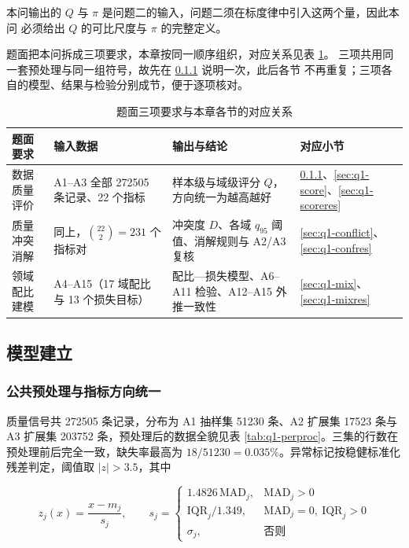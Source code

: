\documentclass[bwprint]{gmcmthesis}
\numberwithin{equation}{section}
\numberwithin{figure}{section}
\numberwithin{table}{section}
\begin{document}
本问输出的 $Q$ 与 $\pi$ 是问题二的输入，问题二须在标度律中引入这两个量，因此本问
必须给出 $Q$ 的可比尺度与 $\pi$ 的完整定义。

题面把本问拆成三项要求，本章按同一顺序组织，对应关系见表 \ref{tab:q1-map}。
三项共用同一套预处理与同一组符号，故先在 \ref{sec:q1-pre} 说明一次，此后各节
不再重复；三项各自的模型、结果与检验分别成节，便于逐项核对。

\begin{table}[htp!]
\centering
\renewcommand\arraystretch{1.25}
\caption{题面三项要求与本章各节的对应关系}\label{tab:q1-map}
\begin{tabularx}{\textwidth}{@{}lXXX@{}}
\toprule
题面要求 & 输入数据 & 输出与结论 & 对应小节 \\
\midrule
数据质量评价 & A1--A3 全部 272505 条记录、22 个指标 &
样本级与域级评分 $Q$，方向统一为越高越好 & \ref{sec:q1-pre}、\ref{sec:q1-score}、\ref{sec:q1-scoreres} \\
质量冲突消解 & 同上，$\binom{22}{2}=231$ 个指标对 &
冲突度 $D$、各域 $q_{95}$ 阈值、消解规则与 A2/A3 复核 & \ref{sec:q1-conflict}、\ref{sec:q1-confres} \\
领域配比建模 & A4--A15（17 域配比与 13 个损失目标） &
配比—损失模型、A6--A11 检验、A12--A15 外推一致性 & \ref{sec:q1-mix}、\ref{sec:q1-mixres} \\
\bottomrule
\end{tabularx}
\end{table}

\subsection{模型建立}

\subsubsection{公共预处理与指标方向统一}\label{sec:q1-pre}

质量信号共 272505 条记录，分布为 A1 抽样集 51230 条、A2 扩展集 17523 条与
A3 扩展集 203752 条，预处理后的数据全貌见表 \ref{tab:q1-perproc}。三集的行数在
预处理前后完全一致，缺失率最高为 $18/51230 = 0.035\%$。异常标记按稳健标准化
残差判定，阈值取 $|z|>3.5$，其中

\begin{equation}
z_j(x)=\frac{x-m_j}{s_j},\qquad
s_j=\begin{cases}1.4826\,\mathrm{MAD}_j, & \mathrm{MAD}_j>0\\[2pt]
\mathrm{IQR}_j/1.349, & \mathrm{MAD}_j=0,\ \mathrm{IQR}_j>0\\[2pt]
\sigma_j, & \text{否则}\end{cases}
\end{equation}
\end{document}
